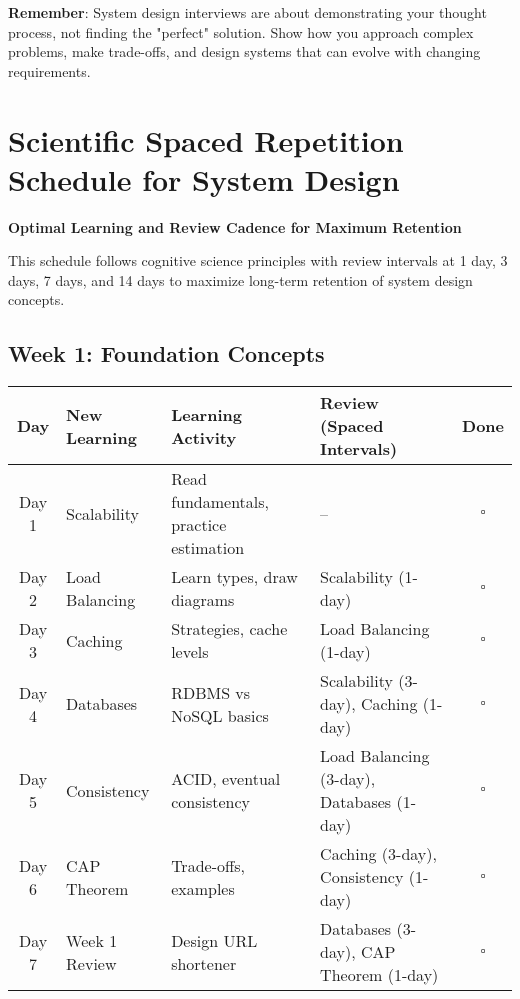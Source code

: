 \documentclass[10pt,a4paper]{article}
\begin{document}
\begin{tradeoffbox}
\textbf{Remember}: System design interviews are about demonstrating your thought process, not finding the "perfect" solution. Show how you approach complex problems, make trade-offs, and design systems that can evolve with changing requirements.
\end{tradeoffbox}

\newpage
\section{Scientific Spaced Repetition Schedule for System Design}

\textbf{Optimal Learning and Review Cadence for Maximum Retention}

This schedule follows cognitive science principles with review intervals at 1 day, 3 days, 7 days, and 14 days to maximize long-term retention of system design concepts.

\subsection{Week 1: Foundation Concepts}

\begin{table}[h]
\centering
\small
\begin{tabular}{|c|p{3cm}|p{4cm}|p{4cm}|c|}
\hline
\textbf{Day} & \textbf{New Learning} & \textbf{Learning Activity} & \textbf{Review (Spaced Intervals)} & \textbf{Done} \\
\hline
Day 1 & Scalability & Read fundamentals, practice estimation & -- & $\square$ \\
\hline
Day 2 & Load Balancing & Learn types, draw diagrams & Scalability (1-day) & $\square$ \\
\hline
Day 3 & Caching & Strategies, cache levels & Load Balancing (1-day) & $\square$ \\
\hline
Day 4 & Databases & RDBMS vs NoSQL basics & Scalability (3-day), Caching (1-day) & $\square$ \\
\hline
Day 5 & Consistency & ACID, eventual consistency & Load Balancing (3-day), Databases (1-day) & $\square$ \\
\hline
Day 6 & CAP Theorem & Trade-offs, examples & Caching (3-day), Consistency (1-day) & $\square$ \\
\hline
Day 7 & Week 1 Review & Design URL shortener & Databases (3-day), CAP Theorem (1-day) & $\square$ \\
\hline
\end{tabular}
\end{table}
\end{document}
